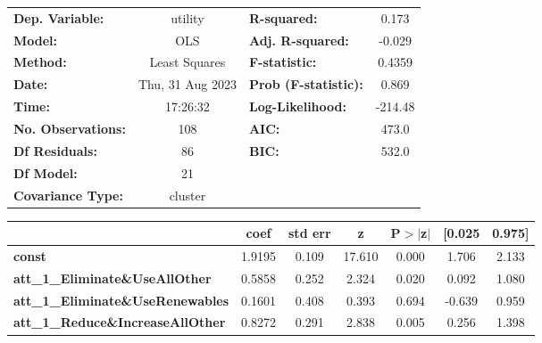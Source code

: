 \begin{center}
\begin{tabular}{lclc}
\toprule
\textbf{Dep. Variable:}                     &     utility      & \textbf{  R-squared:         } &     0.173   \\
\textbf{Model:}                             &       OLS        & \textbf{  Adj. R-squared:    } &    -0.029   \\
\textbf{Method:}                            &  Least Squares   & \textbf{  F-statistic:       } &    0.4359   \\
\textbf{Date:}                              & Thu, 31 Aug 2023 & \textbf{  Prob (F-statistic):} &    0.869    \\
\textbf{Time:}                              &     17:26:32     & \textbf{  Log-Likelihood:    } &   -214.48   \\
\textbf{No. Observations:}                  &         108      & \textbf{  AIC:               } &     473.0   \\
\textbf{Df Residuals:}                      &          86      & \textbf{  BIC:               } &     532.0   \\
\textbf{Df Model:}                          &          21      & \textbf{                     } &             \\
\textbf{Covariance Type:}                   &     cluster      & \textbf{                     } &             \\
\bottomrule
\end{tabular}
\begin{tabular}{lcccccc}
                                            & \textbf{coef} & \textbf{std err} & \textbf{z} & \textbf{P$> |$z$|$} & \textbf{[0.025} & \textbf{0.975]}  \\
\midrule
\textbf{const}                              &       1.9195  &        0.109     &    17.610  &         0.000        &        1.706    &        2.133     \\
\textbf{att\_1\_Eliminate\&UseAllOther}     &       0.5858  &        0.252     &     2.324  &         0.020        &        0.092    &        1.080     \\
\textbf{att\_1\_Eliminate\&UseRenewables}   &       0.1601  &        0.408     &     0.393  &         0.694        &       -0.639    &        0.959     \\
\textbf{att\_1\_Reduce\&IncreaseAllOther}   &       0.8272  &        0.291     &     2.838  &         0.005        &        0.256    &        1.398     \\

\end{tabular}
\end{center}
